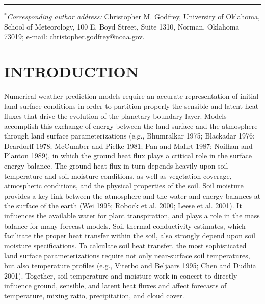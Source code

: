 \documentclass[twocolumn]{article}
\begin{document}
{\textfloatsep 0.1875in
\begin{table}[!b]
\hrule height 0.05pt width 0.5625in	%
\vspace{0.125in}
{\footnotesize
{\it $^{*}$Corresponding author address:}
Christopher M. Godfrey, University of Oklahoma, School of Meteorology, 
100 E. Boyd Street, Suite 1310, Norman, Oklahoma 73019; e-mail: christopher.godfrey@noaa.gov.
}
\end{table}
}

\section{{\normalsize \hspace{-0.195in} {\textbf{
INTRODUCTION
}}}} \vspace{-1.6mm}
\label{etacomp_intro.sec}
Numerical weather prediction models require an accurate representation of initial land surface conditions in order to partition properly the sensible and latent heat fluxes that drive the evolution of the planetary boundary layer.  Models accomplish this exchange of energy between the land surface and the atmosphere through land surface parameterizations (e.g., Bhumralkar 1975; Blackadar 1976; Deardorff 1978; McCumber and Pielke 1981; Pan and Mahrt 1987; Noilhan and Planton 1989), in which the ground heat flux plays a critical role in the surface energy balance.  The ground heat flux in turn depends heavily upon soil temperature and soil moisture conditions, as well as vegetation coverage, atmospheric conditions, and the physical properties of the soil.  Soil moisture provides a key link between the atmosphere and the water and energy balances at the surface of the earth (Wei 1995; Robock et al. 2000; Leese et al. 2001).  It influences the available water for plant transpiration, and plays a role in the mass balance for many forecast models.  Soil thermal conductivity estimates, which facilitate the proper heat transfer within the soil, also strongly depend upon soil moisture specifications.  To calculate soil heat transfer, the most sophisticated land surface parameterizations require not only near-surface soil temperatures, but also temperature profiles (e.g., Viterbo and Beljaars 1995; Chen and Dudhia 2001).  Together, soil temperature and moisture work in concert to directly influence ground, sensible, and latent heat fluxes and affect forecasts of temperature, mixing ratio, precipitation, and cloud cover.
\end{document}

